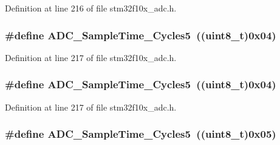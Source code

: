 Definition at line 216 of file stm32f10x\+\_\+adc.\+h.

\subsubsection[{\texorpdfstring{A\+D\+C\+\_\+\+Sample\+Time\+\_\+41\+Cycles5}{ADC_SampleTime_41Cycles5}}]{\setlength{\rightskip}{0pt plus 5cm}\#define A\+D\+C\+\_\+\+Sample\+Time\+\_\+Cycles5~(({\bf uint8\+\_\+t})0x04)}\hypertarget{group___a_d_c__sampling__time_gadc3d26f9bf5fa6589889cc938c66e0e7}{}\label{group___a_d_c__sampling__time_gadc3d26f9bf5fa6589889cc938c66e0e7}


Definition at line 217 of file stm32f10x\+\_\+adc.\+h.

\subsubsection[{\texorpdfstring{A\+D\+C\+\_\+\+Sample\+Time\+\_\+41\+Cycles5}{ADC_SampleTime_41Cycles5}}]{\setlength{\rightskip}{0pt plus 5cm}\#define A\+D\+C\+\_\+\+Sample\+Time\+\_\+Cycles5~(({\bf uint8\+\_\+t})0x04)}\hypertarget{group___a_d_c__sampling__time_gadc3d26f9bf5fa6589889cc938c66e0e7}{}\label{group___a_d_c__sampling__time_gadc3d26f9bf5fa6589889cc938c66e0e7}


Definition at line 217 of file stm32f10x\+\_\+adc.\+h.

\subsubsection[{\texorpdfstring{A\+D\+C\+\_\+\+Sample\+Time\+\_\+55\+Cycles5}{ADC_SampleTime_55Cycles5}}]{\setlength{\rightskip}{0pt plus 5cm}\#define A\+D\+C\+\_\+\+Sample\+Time\+\_\+Cycles5~(({\bf uint8\+\_\+t})0x05)}\hypertarget{group___a_d_c__sampling__time_ga6a6fbbadc0e35a719fb749bf6b0704d6}{}\label{group___a_d_c__sampling__time_ga6a6fbbadc0e35a719fb749bf6b0704d6}


